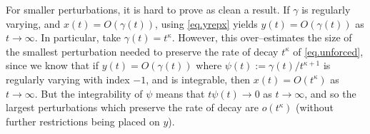 \documentclass[a4paper,10pt,reqno]{amsart}
\numberwithin{equation}{section}
\newtheorem{theorem}{Theorem}
\theoremstyle{definition}
\theoremstyle{remark}
\DeclareMathOperator{\1}{\mathbbm 1}
\begin{document}
For smaller perturbations, it is hard to prove as clean a result. If $\gamma$ is regularly varying, and $x(t)=O(\gamma(t))$,  using \eqref{eq.yrepx} yields $y(t)=O(\gamma(t))$ as $t\to\infty$. In particular, take $\gamma(t)=t^\kappa$. However, this over--estimates the size of the smallest perturbation needed to preserve the rate of decay $t^\kappa$ of \eqref{eq.unforced}, since we know that if $y(t)=O(\gamma(t))$ where $\psi(t):=\gamma(t)/t^{\kappa+1}$ is regularly varying with index $-1$, and is integrable, then $x(t)=O(t^\kappa)$ as $t\to\infty$. But the integrability of $\psi$ means that $t\psi(t)\to 0$ as $t\to\infty$, and so the largest perturbations which preserve the rate of decay are $o(t^\kappa)$ (without further restrictions being placed on $y$). 
\end{document}
